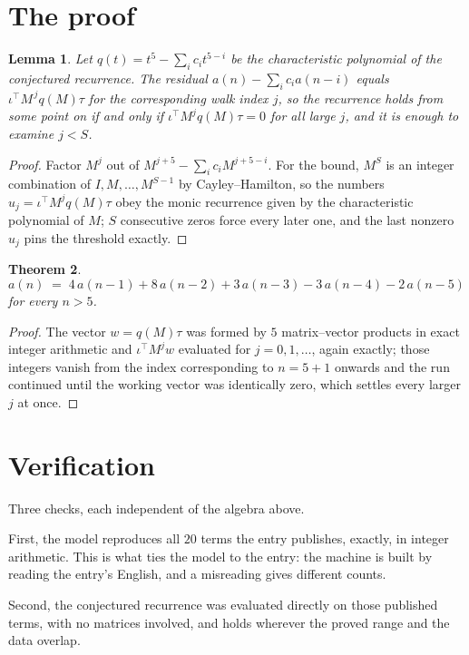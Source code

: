 \documentclass[11pt,a4paper]{article}
\theoremstyle{plain}
\newtheorem{theorem}{Theorem}
\newtheorem{lemma}[theorem]{Lemma}
\theoremstyle{definition}
\begin{document}
\section{The proof}

\begin{lemma}\label{lem:crit}
Let $q(t)=t^{5}-\sum_i c_it^{5-i}$ be the characteristic polynomial of the
conjectured recurrence. The residual $a(n)-\sum_ic_ia(n-i)$ equals
$\iota^{\!\top}M^{\,j}q(M)\tau$ for the corresponding walk index $j$, so the recurrence
holds from some point on if and only if $\iota^{\!\top}M^{j}q(M)\tau=0$ for all large $j$,
and it is enough to examine $j<S$.
\end{lemma}

\begin{proof}
Factor $M^{j}$ out of $M^{j+5}-\sum_ic_iM^{j+5-i}$. For the bound, $M^{S}$
is an integer combination of $I,M,\dots,M^{S-1}$ by Cayley--Hamilton, so the numbers
$u_j=\iota^{\!\top}M^{j}q(M)\tau$ obey the monic recurrence given by the characteristic
polynomial of $M$; $S$ consecutive zeros force every later one, and the last nonzero $u_j$
pins the threshold exactly.
\end{proof}

\begin{theorem}
\[
a(n)\;=\;4\,a(n-1) + 8\,a(n-2) + 3\,a(n-3) - 3\,a(n-4) - 2\,a(n-5)
\]
for every $n>5$.
\end{theorem}

\begin{proof}
The vector $w=q(M)\tau$ was formed by $5$ matrix--vector products in exact integer
arithmetic and $\iota^{\!\top}M^{j}w$ evaluated for $j=0,1,\dots$, again exactly; those
integers vanish from the index corresponding to $n=5+1$ onwards and the run continued
until the working vector was identically zero, which settles every larger $j$ at once.
\end{proof}

\section{Verification}

Three checks, each independent of the algebra above.

First, the model reproduces all $20$ terms the entry publishes, exactly, in integer
arithmetic. This is what ties the model to the entry: the machine is built by reading the
entry's English, and a misreading gives different counts.

Second, the conjectured recurrence was evaluated directly on those published terms, with no
matrices involved, and holds wherever the proved range and the data overlap.
\end{document}
